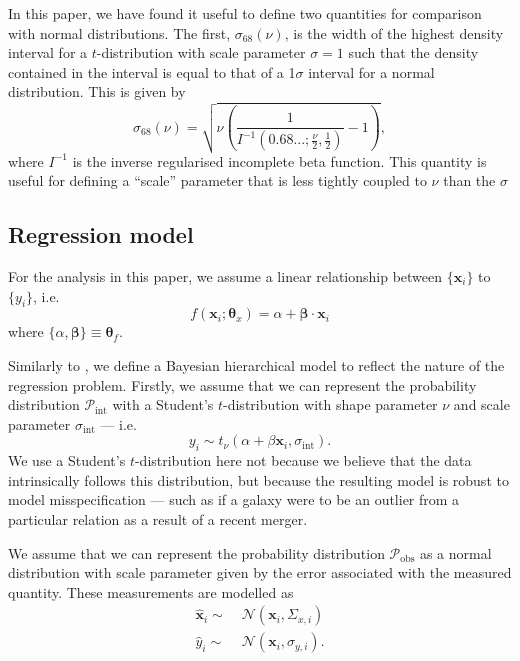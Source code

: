 \documentclass[fleqn,usenatbib]{mnras}
\newcommand{\studentt}[2]{t_\nu \left( #1, #2 \right)}
\newcommand{\depvar}{y_i}
\newcommand{\indepvars}{\boldsymbol{x}_i}
\newcommand{\obsdep}{\hat{y}_i}
\newcommand{\obsindep}{\hat{\boldsymbol{x}}_i}
\newcommand{\indepcov}{\Sigma_{x, i}}
\newcommand{\deperr}{\sigma_{y, i}}
\newcommand{\intscttr}{\sigma_{\text{int}}}
\newcommand{\intercept}{\alpha}
\newcommand{\covariate}{\beta}
\begin{document}
In this paper, we have found it useful to define two quantities for comparison
with normal distributions. The first, $\sigma_{68}(\nu)$, is the width of the
highest density interval for a $t$-distribution with scale parameter
$\sigma = 1$ such that the density contained in the interval is equal to that
of a 1$\sigma$ interval for a normal distribution. This is given by
\begin{equation}
    \sigma_{68}(\nu) = \sqrt{\nu \left(\frac{1}{I^{-1}(0.68...;\frac\nu2, \frac12)} - 1\right)},
\end{equation}
where $I^{-1}$ is the inverse regularised incomplete beta function. This
quantity is useful for defining a ``scale'' parameter that is less tightly
coupled to $\nu$ than the $\sigma$

\subsection{Regression model}
\label{sec:formalism.model}

For the analysis in this paper, we assume a linear relationship between
$\{\boldsymbol{x}_i\}$ to $\{y_i\}$, i.e.
\begin{equation}
    f(\boldsymbol{x}_i; \boldsymbol{\theta}_x) =
        \alpha + \boldsymbol{\beta} \cdot \boldsymbol{x}_i
\end{equation}
where $\{\alpha, \boldsymbol{\beta}\} \equiv \boldsymbol{\theta}_f$.

Similarly to \citet{Kelly:2007}, we define a Bayesian hierarchical model to
reflect the nature of the regression problem. Firstly, we assume that we can
represent the probability distribution $\mathcal P_{\text{int}}$ with a
Student's $t$-distribution with shape parameter $\nu$ and scale parameter
$\sigma_{\text{int}}$ --- i.e.
\begin{equation}
\depvar \sim \studentt{\intercept + \covariate \indepvars}{\intscttr}.
\end{equation}
We use a Student's $t$-distribution here not because we believe that the data
intrinsically follows this distribution, but because the resulting model is
robust to model misspecification --- such as if a galaxy were
to be an outlier from a particular relation as a result of a recent merger.

We assume that we can represent the probability distribution
$\mathcal P_{\text{obs}}$ as a normal distribution with scale parameter given by
the error associated with the measured quantity. These measurements are modelled
as
\begin{align}
    \obsindep \sim&\; \mathcal N\left({\indepvars}, {\indepcov}\right) \\
    \obsdep \sim&\; \mathcal N\left({\indepvars}, {\deperr}\right).
\end{align}
\end{document}
